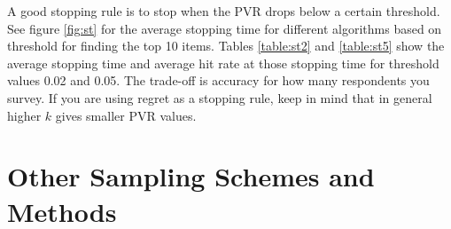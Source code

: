 \documentclass[a4paper,12pt]{article}
\begin{document}
A good stopping rule is to stop when the PVR drops below a certain threshold. See figure \ref{fig:st} for the average stopping time for different algorithms based on threshold for finding the top 10 items. Tables \ref{table:st2} and \ref{table:st5} show the average stopping time and average hit rate at those stopping time for threshold values 0.02 and 0.05. The trade-off is accuracy for how many respondents you survey. If you are using regret as a stopping rule, keep in mind that in general higher $k$ gives smaller PVR values.\\ 
\section{Other Sampling Schemes and Methods}
\end{document}

